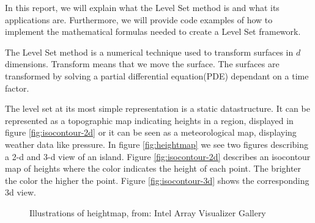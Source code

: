 In this report, we will explain what the Level Set method is and what
its applications are. Furthermore, we will provide code examples of
how to implement the mathematical formulas needed to create a Level
Set framework.

The Level Set method is a numerical technique used to transform
surfaces in $d$ dimensions. Transform means that we move the surface. The surfaces are transformed by solving a
partial differential equation(PDE) dependant on a time factor.

The level set at its most simple representation is a static
datastructure. It can be represented as a topographic map indicating
heights in a region, displayed in figure \vref{fig:isocontour-2d} or
it can be seen as a meteorological map, displaying weather data like
pressure. 
In figure \vref{fig:heightmap} we see two figures describing a 2-d and 3-d view of an island. Figure \vref{fig:isocontour-2d} describes an isocontour map of heights where the color indicates the height of each point. The brighter the color the higher the point. Figure \vref{fig:isocontour-3d} shows the corresponding 3d view.  

\begin{figure}[h]
\begin{center}
\end{center}
\caption{Illustrations of heightmap, from: Intel Array Visualizer Gallery}
\label{fig:heightmap}
\end{figure}

